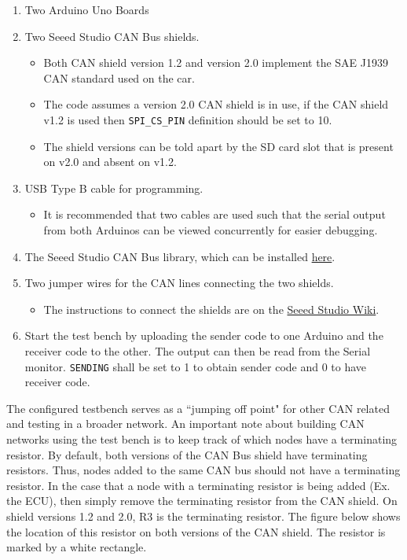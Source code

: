 \documentclass[letterpaper]{article}
\begin{document}
\begin{enumerate}
\item Two Arduino Uno Boards
\item Two Seeed Studio CAN Bus shields.
  \begin{itemize}
    \item Both CAN shield version 1.2 and version 2.0 implement the SAE J1939
      CAN standard used on the car.
    \item The code assumes a version 2.0 CAN shield is in use, if the CAN shield
      v1.2 is used then \lstinline{SPI_CS_PIN} definition should be set to 10.
    \item The shield versions can be told apart by the SD card slot that is
      present on v2.0 and absent on v1.2.
  \end{itemize}
\item USB Type B cable for programming.
  \begin{itemize}
    \item It is recommended that two cables are used such that the serial output
      from both Arduinos can be viewed concurrently for easier debugging.
  \end{itemize}
\item The Seeed Studio CAN Bus library, which can be installed
  \href{https://github.com/Seeed-Studio/CAN_BUS_Shield}{here}.
\item Two jumper wires for the CAN lines connecting the two shields.
  \begin{itemize}
    \item The instructions to connect the shields are on the
      \href{http://wiki.seeedstudio.com/CAN-BUS_Shield_V2.0/}{Seeed Studio Wiki}.
  \end{itemize}
\item Start the test bench by uploading the sender code to one Arduino and the
  receiver code to the other. The output can then be read from the Serial
  monitor. \lstinline{SENDING} shall be set to 1 to obtain sender code and 0 to
  have receiver code.
\end{enumerate}

The configured testbench serves as a ``jumping off point" for other CAN related
and testing in a broader network. An important note about building CAN networks
using the test bench is to keep track of which nodes have a terminating
resistor. By default, both versions of the CAN Bus shield have terminating
resistors. Thus, nodes added to the same CAN bus should not have a terminating
resistor. In the case that a node with a terminating resistor is being added
(Ex. the ECU), then simply remove the terminating resistor from the CAN shield.
On shield versions 1.2 and 2.0, R3 is the terminating resistor. The figure below
shows the location of this resistor on both versions of the CAN shield. The
resistor is marked by a white rectangle.
\end{document}
